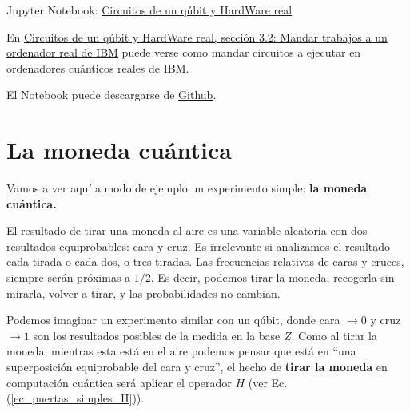 \documentclass[a4paper,11pt]{book} %
\numberwithin{equation}{chapter}
\begin{document}
	\begin{mybox_orange}{Jupyter Notebook: \href{https://www.scbi.uma.es/web/wp-content/uploads/Jupyterbook/CICC_UMA/Notebooks/html/docs/Part_01/Chapter_03-Circuitos_1_qubit_medidas_y_RealHardware_myst.html}{Circuitos de un qúbit y HardWare real}}
	
	En \href{https://www.scbi.uma.es/web/wp-content/uploads/Jupyterbook/CICC_UMA/Notebooks/html/docs/Part_01/Chapter_03-Circuitos_1_qubit_medidas_y_RealHardware_myst.html#mandar-trabajos-a-un-ordenador-real-de-ibm}{Circuitos de un qúbit y HardWare real, sección 3.2: Mandar trabajos a un ordenador real de IBM}  puede verse como mandar circuitos a ejecutar en ordenadores 
	cuánticos reales de IBM.
	
	El Notebook puede descargarse de \href{https://github.com/davidcb98/CICC_UMA/blob/master/Notebooks/Part_01/Chapter_03-Circuitos_1_qubit_medidas_y_RealHardware.ipynb}{Github}.
	\end{mybox_orange}
	
		

    \section{La moneda cuántica}
    
Vamos a ver aquí a modo de ejemplo un experimento simple: \textbf{la moneda cuántica.}

El resultado de tirar una moneda al aire es una variable aleatoria con dos resultados equiprobables:  cara y cruz.  Es irrelevante si analizamos el resultado cada tirada o cada dos, o tres tiradas. Las frecuencias relativas de caras y cruces, siempre serán próximas a $1/2$. Es decir, podemos tirar la moneda, recogerla sin mirarla, volver a tirar, y las probabilidades no cambian.

Podemos imaginar un experimento similar con un qúbit, donde cara $\to 0$ y cruz $\to 1$ son los resultados posibles de la medida en la base $Z$. Como al tirar la moneda, mientras esta está en el aire podemos pensar que está en ``una superposición equiprobable del cara y cruz'', el hecho de \textbf{tirar la moneda} en computación cuántica será aplicar el operador $H$ (ver Ec. (\ref{ec_puertas_simples_H})). 
\end{document}

